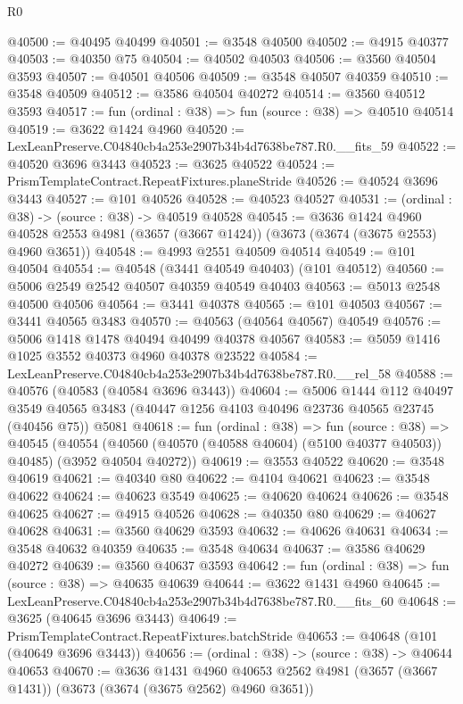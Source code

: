 \begin{lexlean}{R0}
\begin{coremodule}
@40500 := @40495 @40499
@40501 := @3548 @40500
@40502 := @4915 @40377
@40503 := @40350 @75
@40504 := @40502 @40503
@40506 := @3560 @40504 @3593
@40507 := @40501 @40506
@40509 := @3548 @40507 @40359
@40510 := @3548 @40509
@40512 := @3586 @40504 @40272
@40514 := @3560 @40512 @3593
@40517 := fun (ordinal : @38) => fun (source : @38) => @40510 @40514
@40519 := @3622 @1424 @4960
@40520 := LexLeanPreserve.C04840cb4a253e2907b34b4d7638be787.R0.__fits_59
@40522 := @40520 @3696 @3443
@40523 := @3625 @40522
@40524 := PrismTemplateContract.RepeatFixtures.planeStride
@40526 := @40524 @3696 @3443
@40527 := @101 @40526
@40528 := @40523 @40527
@40531 := (ordinal : @38) -> (source : @38) -> @40519 @40528
@40545 := @3636
    @1424
    @4960
    @40528
    @2553
    @4981
    (@3657 (@3667 @1424))
    (@3673 (@3674 (@3675 @2553) @4960 @3651))
@40548 := @4993 @2551 @40509 @40514
@40549 := @101 @40504
@40554 := @40548 (@3441 @40549 @40403) (@101 @40512)
@40560 := @5006 @2549 @2542 @40507 @40359 @40549 @40403
@40563 := @5013 @2548 @40500 @40506
@40564 := @3441 @40378
@40565 := @101 @40503
@40567 := @3441 @40565 @3483
@40570 := @40563 (@40564 @40567) @40549
@40576 := @5006 @1418 @1478 @40494 @40499 @40378 @40567
@40583 := @5059 @1416 @1025 @3552 @40373 @4960 @40378 @23522
@40584 := LexLeanPreserve.C04840cb4a253e2907b34b4d7638be787.R0.__rel_58
@40588 := @40576 (@40583 (@40584 @3696 @3443))
@40604 := @5006
    @1444
    @112
    @40497
    @3549
    @40565
    @3483
    (@40447 @1256 @4103 @40496 @23736 @40565 @23745 (@40456 @75))
    @5081
@40618 := fun (ordinal : @38) =>
  fun (source : @38) =>
  @40545
    (@40554 (@40560 (@40570 (@40588 @40604) (@5100 @40377 @40503)) @40485) (@3952 @40504 @40272))
@40619 := @3553 @40522
@40620 := @3548 @40619
@40621 := @40340 @80
@40622 := @4104 @40621
@40623 := @3548 @40622
@40624 := @40623 @3549
@40625 := @40620 @40624
@40626 := @3548 @40625
@40627 := @4915 @40526
@40628 := @40350 @80
@40629 := @40627 @40628
@40631 := @3560 @40629 @3593
@40632 := @40626 @40631
@40634 := @3548 @40632 @40359
@40635 := @3548 @40634
@40637 := @3586 @40629 @40272
@40639 := @3560 @40637 @3593
@40642 := fun (ordinal : @38) => fun (source : @38) => @40635 @40639
@40644 := @3622 @1431 @4960
@40645 := LexLeanPreserve.C04840cb4a253e2907b34b4d7638be787.R0.__fits_60
@40648 := @3625 (@40645 @3696 @3443)
@40649 := PrismTemplateContract.RepeatFixtures.batchStride
@40653 := @40648 (@101 (@40649 @3696 @3443))
@40656 := (ordinal : @38) -> (source : @38) -> @40644 @40653
@40670 := @3636
    @1431
    @4960
    @40653
    @2562
    @4981
    (@3657 (@3667 @1431))
    (@3673 (@3674 (@3675 @2562) @4960 @3651))

\end{coremodule}
\end{lexlean}
